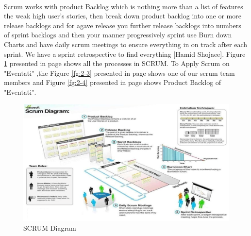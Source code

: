 \documentclass[12pt,a4paper,class,twoside,openany]{report}
\begin{document}
\paragraph*{\hspace{.9 cm} } Scrum works with product Backlog which is nothing more than a list of features the weak high user's stories, then break down product backlog into one or more release backlogs and for agave release you further release backlogs into numbers of sprint backlogs and then your manner progressively sprint use Burn down Charts and have daily scrum meetings to ensure everything in on track after each sprint. We have a sprint retrospective to find everything [Hamid Shojaee]. Figure \ref{fg:2-2} presented in page \pageref{fg:2-2} shows all the processes in SCRUM. To Apply Scrum on "Eventati" ,the Figure \ref{fg:2-3} presented in page \pageref{fg:2-3} shows one of our scrum team members and Figure \ref{fg:2-4} presented in page \pageref{fg:2-4} shows Product Backlog of "Eventati".
\begin{figure}
\begin{center}
\includegraphics[angle=90,width=4.5 in]{2-2}
\caption{SCRUM Diagram}
\label{fg:2-2}
\end{center}
\end{figure}\\
\end{document}
